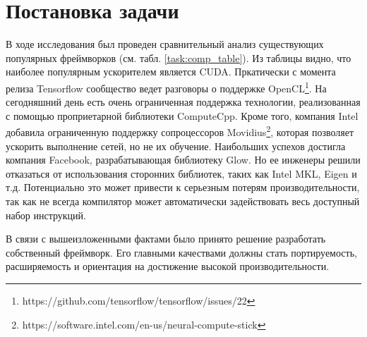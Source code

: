 \clearpage
\section{Постановка задачи}
В ходе исследования был проведен сравнительный анализ существующих популярных
фреймворков (см. табл. \ref{task:comp_table}). Из таблицы видно, что наиболее 
популярным ускорителем является CUDA. Пркатически с момента релиза Tensorflow 
сообщество ведет разговоры о поддержке OpenCL\footnote{https://github.com/tensorflow/tensorflow/issues/22}. 
На сегодняшний день есть очень ограниченная поддержка технологии, реализованная 
с помощью проприетарной библиотеки ComputeCpp. Кроме того, компания Intel 
добавила ограниченную поддержку сопроцессоров Movidius\footnote{https://software.intel.com/en-us/neural-compute-stick}, 
которая позволяет ускорить выполнение сетей, но не их обучение. Наибольших 
успехов достигла компания Facebook, разрабатывающая библиотеку Glow. Но ее 
инженеры решили отказаться от использования сторонних библиотек, таких как Intel
MKL, Eigen и т.д. Потенциально это может привести к серьезным потерям 
производительности, так как не всегда компилятор может автоматически 
задействовать весь доступный набор инструкций.
\par
В связи с вышеизложенными фактами было принято решение разработать собственный 
фреймворк. Его главными качествами должны стать портируемость, расширяемость и 
ориентация на достижение высокой производительности.
\par
